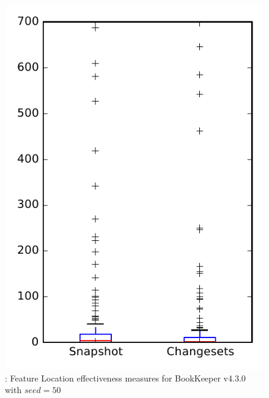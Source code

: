 
\begin{figure}
\centering
\includegraphics[height=0.4\textheight]{figures/flt_seed/rq1_bookkeeper_50}
\caption{\rone: Feature Location effectiveness measures for BookKeeper v4.3.0 with $seed=50$}
\label{fig:flt_seed:rq1:bookkeeper}
\end{figure}
